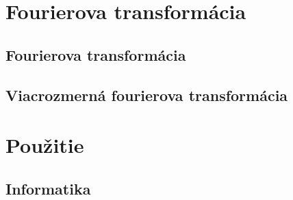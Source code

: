 %
%


\chapter{Fourierova transformácia}
    
    
    
    
\section{Fourierova transformácia}
\section{Viacrozmerná fourierova transformácia}
    

%    
%    
%    
%    
%    
%    
%    
%    
%    
%    

\chapter{Použitie}
%    
%    
%    
%    
%    
         
%    
%    
%    
%    
    
\section{Informatika}
    
    
    
    
    
    
    
    


